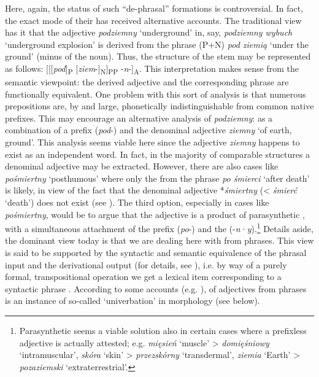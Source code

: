 \documentclass[output=paper]{LSP/langsci}
\begin{document}
{Here, again, the status of such “de-phrasal” formations is controversial. In fact, the exact mode of their  has received alternative accounts. The traditional view has it that the adjective} {\textit{podziemny}} {‘underground’ in, say,} {\textit{podziemny wybuch}} {‘underground explosion’ is derived from the  phrase (P+N)} {\textit{pod ziemią}} {‘under the ground’ (minus  of the noun). Thus, the structure of the  stem may be represented as follows: [[[}{\textit{pod}}]{\textsubscript{P}} [{\textit{ziem}}{-]}{\textsubscript{N}}]{\textsubscript{PP} }{-}{\textit{n}}{-]}{\textsubscript{A}}{. This interpretation makes sense from the semantic viewpoint: the derived adjective and the corresponding phrase are functionally equivalent. One problem with this sort of analysis is that numerous  prepositions are, by and large, phonetically indistinguishable from common native prefixes. This may encourage an alternative analysis of} {\textit{podziemny}}{: as a combination of a prefix (}{\textit{pod}}{-) and the denominal adjective} {\textit{ziemny}} {‘of earth, ground’. This analysis seems viable here since the adjective} {\textit{ziemny}} {happens to exist as an independent word. In fact, in the majority of comparable structures a denominal adjective may be extracted. However, there are also cases like} {\textit{pośmiertny}} {‘posthumous’ where only the  from the  phrase} {\textit{po śmierci}} {‘after death’ is likely, in view of the fact that the denominal adjective *}{\textit{śmiertny}} {(<} {\textit{śmierć}} {‘death’) does not exist (see \citealt[499]{Kallas1999}). The third option, especially in cases like} {\textit{pośmiertny}}{, would be to argue that the adjective is a product of parasynthetic , with a simultaneous attachment of the prefix (}{\textit{po}}{-) and the  (-}{\textit{n}}·{\textit{y}}).\footnote{{Parasynthetic  seems a viable solution also in certain cases where a prefixless adjective is actually attested; e.g.} {\textit{mięsień}} {‘muscle’ >} {\textit{domięśniowy}} {‘intramuscular’,} {\textit{skóra}} {‘skin’ >} {\textit{przezskórny}} {‘transdermal’,} {\textit{ziemia}} {‘Earth’ >} {\textit{pozaziemski}} {‘extraterrestrial’.}} {Details aside, the dominant view today is that we are dealing here with  from  phrases. This view is said to be supported by the syntactic and semantic equivalence of the phrasal input and the derivational output (for details, see \citealt[500]{Kallas1999}), i.e. by way of a purely formal, transpositional operation we get a lexical item corresponding to a syntactic phrase \citep[71]{Grzegorczykowa1979}. According to some accounts (e.g. \citealt{Wójcikowska1991}),  of adjectives from  phrases is an instance of so-called ‘univerbation’ in  morphology (see below).}
\end{document}
